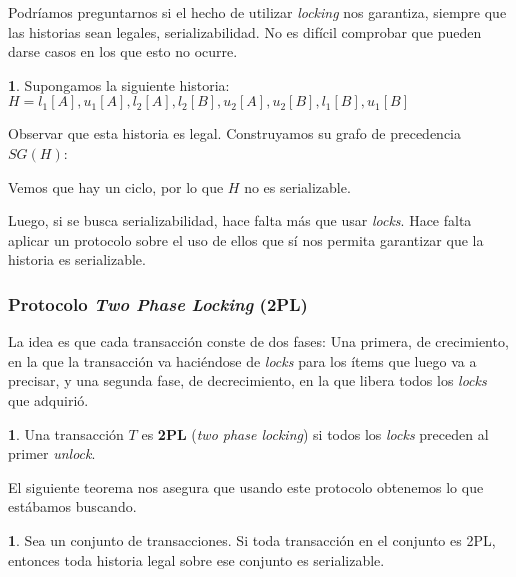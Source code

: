 \documentclass[english,titlepage]{article}
\theoremstyle{definition}
\theoremstyle{definition}
\newtheorem{example}[thm]{\protect\examplename}
\providecommand{\examplename}{Ejemplo}
\newtheorem*{defn*}{\protect\definitionname}
\providecommand{\definitionname}{Definición}
\newtheorem*{thm*}{\protect\theoremname}
\providecommand{\theoremname}{Teorema}
\begin{document}
Podríamos preguntarnos si el hecho de utilizar \emph{locking} nos garantiza,
siempre que las historias sean legales, serializabilidad. No es difícil
comprobar que pueden darse casos en los que esto no ocurre.

\begin{example}
Supongamos la siguiente historia: \\
$H = l_1[A], u_1[A], l_2[A], l_2[B], u_2[A], u_2[B], l_1[B], u_1[B]$

Observar que esta historia es legal. Construyamos su grafo de precedencia
$SG(H)$: 

\vspace{10pt}


\vspace{10pt}

Vemos que hay un ciclo, por lo que $H$ no es serializable.
\end{example}

Luego, si se busca serializabilidad, hace falta más que usar \emph{locks}.
Hace falta aplicar un protocolo sobre el uso de ellos que sí nos permita
garantizar que la historia es serializable.

\subsubsection{Protocolo \emph{Two Phase Locking} (2PL)}

La idea es que cada transacción conste de dos fases: Una primera, de
crecimiento, en la que la transacción va haciéndose de \emph{locks} para los
ítems que luego va a precisar, y una segunda fase, de decrecimiento, en la que
libera todos los \emph{locks} que adquirió.

\begin{defn*}
Una transacción $T$ es \textbf{2PL} (\emph{two phase locking}) si todos los
\emph{locks} preceden al primer \emph{unlock}.
\end{defn*}

El siguiente teorema nos asegura que usando este protocolo obtenemos lo que
estábamos buscando.

\begin{thm*}
Sea un conjunto de transacciones. Si toda transacción en el conjunto es 2PL,
entonces toda historia legal sobre ese conjunto es serializable.
\end{thm*}
\end{document}
